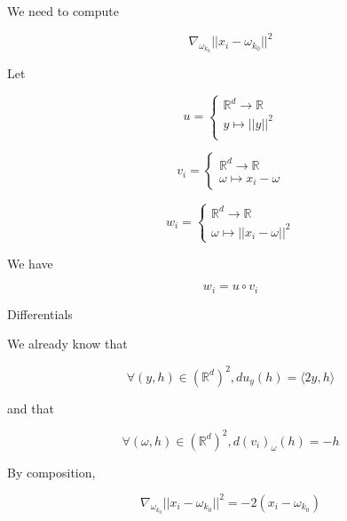 \documentclass[usenames,dvipsnames]{beamer}
\begin{document}
\begin{frame}

    We need to compute

    \begin{equation}
        \nabla_{\omega_{k_0}} ||x_i-\omega_{k_0}||^2
    \end{equation}

    Let 

$$
u = \left\{
    \begin{array}{ll}
	\mathbb{R}^d\rightarrow \mathbb{R}    \\
	y \mapsto   ||y||^2 \\
    \end{array}
    \right.
    $$

$$
v_i = \left\{
    \begin{array}{ll}
	\mathbb{R}^d\rightarrow \mathbb{R}    \\
	\omega \mapsto   x_i-\omega
    \end{array}
    \right.
    $$


$$
w_i = \left\{
    \begin{array}{ll}
	\mathbb{R}^d\rightarrow \mathbb{R}    \\
	\omega \mapsto   ||x_i-\omega||^2
    \end{array}
    \right.
    $$

    We have

    \begin{equation}
       w_i = u\circ v_i 
    \end{equation}
\end{frame}

\begin{frame}{Differentials}

We already know that

    \begin{equation}
	\forall (y, h)\in (\mathbb{R}^d)^2, du_y(h) = \langle 2y, h \rangle
    \end{equation}

    and that

    \begin{equation}
	\forall (\omega, h)\in (\mathbb{R}^d)^2, d(v_{i})_{\omega}(h) = -h
    \end{equation}

    By composition, 
    
    \begin{equation}
	\nabla_{\omega_{k_0}} ||x_i-\omega_{k_0}||^2 = -2 (x_i-\omega_{k_0})
    \end{equation}
\end{frame}
\end{document}
